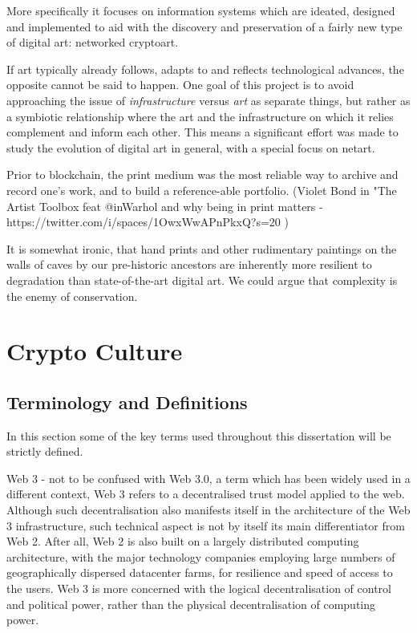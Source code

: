 More specifically it focuses on information systems which are ideated, designed and implemented to aid with the discovery and preservation of a fairly new type of digital art: networked cryptoart. 



If art typically already follows, adapts to and reflects technological advances, the opposite cannot be said to happen. One goal of this project is to avoid approaching the issue of \emph{infrastructure} versus \emph{art} as separate things, but rather as a symbiotic relationship where the art and the infrastructure on which it relies complement and inform each other. This means a significant effort was made to study the evolution of digital art in general, with a special focus on netart. 

Prior to blockchain, the print medium was the most reliable way to archive and record one's work, and to build a reference-able portfolio. (Violet Bond in "The Artist Toolbox feat @inWarhol and why being in print matters - https://twitter.com/i/spaces/1OwxWwAPnPkxQ?s=20 )

It is somewhat ironic, that hand prints and other rudimentary paintings on the walls of caves by our pre-historic ancestors are inherently more resilient to degradation than state-of-the-art digital art. We could argue that complexity is the enemy of conservation.


\section{Crypto Culture}


\subsection{Terminology and Definitions}

In this section some of the key terms used throughout this dissertation will be strictly defined.

Web 3 - not to be confused with Web 3.0, a term which has been widely used in a different context, Web 3 refers to a decentralised trust model applied to the web. Although such decentralisation also manifests itself in the architecture of the Web 3 infrastructure, such technical aspect is not by itself its main differentiator from Web 2. After all, Web 2 is also built on a largely distributed computing architecture, with the major technology companies employing large numbers of geographically dispersed datacenter farms, for resilience and speed of access to the users. Web 3 is more concerned with the logical decentralisation of control and political power, rather than the physical decentralisation of computing power.

